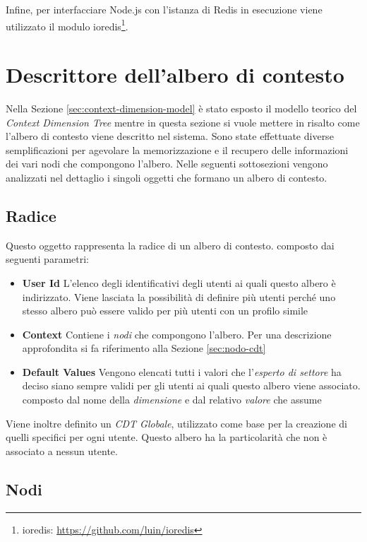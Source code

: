 Infine, per interfacciare Node.js con l'istanza di Redis in esecuzione viene utilizzato il modulo ioredis\footnote{ioredis: \url{https://github.com/luin/ioredis}}.

\section{Descrittore dell'albero di contesto\label{sec:descrittore-albero-contesto}}

Nella Sezione \ref{sec:context-dimension-model} è stato esposto il modello teorico del \emph{Context Dimension Tree} mentre in questa sezione si vuole mettere in risalto come l'albero di contesto viene descritto nel sistema. Sono state effettuate diverse semplificazioni per agevolare la memorizzazione e il recupero delle informazioni dei vari nodi che compongono l'albero. Nelle seguenti sottosezioni vengono analizzati nel dettaglio i singoli oggetti che formano un albero di contesto.

\subsection{Radice\label{sec:radice-cdt}}

Questo oggetto rappresenta la radice di un albero di contesto. \upe composto dai seguenti parametri:

\begin{itemize}
	\item \textbf{User Id} L'elenco degli identificativi degli utenti ai quali questo albero è indirizzato. Viene lasciata la possibilità di definire più utenti perché uno stesso albero può essere valido per più utenti con un profilo simile
	\item \textbf{Context} Contiene i \emph{nodi} che compongono l'albero. Per una descrizione approfondita si fa riferimento alla Sezione \ref{sec:nodo-cdt}
	\item \textbf{Default Values} Vengono elencati tutti i valori che l'\emph{esperto di settore} ha deciso siano sempre validi per gli utenti ai quali questo albero viene associato. \upe composto dal nome della \emph{dimensione} e dal relativo \emph{valore} che assume
\end{itemize}

Viene inoltre definito un \emph{CDT Globale}, utilizzato come base per la creazione di quelli specifici per ogni utente. Questo albero ha la particolarità che non è associato a nessun utente.

\subsection{Nodi\label{sec:nodo-cdt}}

